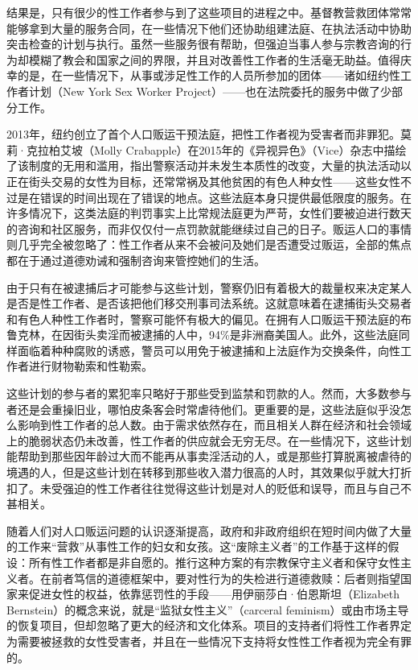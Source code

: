 \documentclass[fontset=fandol, a4paper, 12pt, openright]{ctexbook}
\begin{document}
结果是，只有很少的性工作者参与到了这些项目的进程之中。基督教营救团体常常能够拿到大量的服务合同，在一些情况下他们还协助组建法庭、在执法活动中协助突击检查的计划与执行。虽然一些服务很有帮助，但强迫当事人参与宗教咨询的行为却模糊了教会和国家之间的界限，并且对改善性工作者的生活毫无助益。值得庆幸的是，在一些情况下，从事或涉足性工作的人员所参加的团体——诸如纽约性工作者计划（New York Sex Worker Project）——也在法院委托的服务中做了少部分工作。

2013年，纽约创立了首个人口贩运干预法庭，把性工作者视为受害者而非罪犯。莫莉·克拉柏艾坡（Molly Crabapple）在2015年的《异视异色》（Vice）杂志中描绘了该制度的无用和滥用，指出警察活动并未发生本质性的改变，大量的执法活动以正在街头交易的女性为目标，还常常祸及其他贫困的有色人种女性——这些女性不过是在错误的时间出现在了错误的地点。这些法庭本身只提供最低限度的服务。在许多情况下，这类法庭的判罚事实上比常规法庭更为严苛，女性们要被迫进行数天的咨询和社区服务，而非仅仅付一点罚款就能继续过自己的日子。贩运人口的事情则几乎完全被忽略了：性工作者从来不会被问及她们是否遭受过贩运，全部的焦点都在于通过道德劝诫和强制咨询来管控她们的生活。

由于只有在被逮捕后才可能参与这些计划，警察仍旧有着极大的裁量权来决定某人是否是性工作者、是否该把他们移交刑事司法系统。这就意味着在逮捕街头交易者和有色人种性工作者时，警察可能怀有极大的偏见。在拥有人口贩运干预法庭的布鲁克林，在因街头卖淫而被逮捕的人中，94\%是非洲裔美国人。此外，这些法庭同样面临着种种腐败的诱惑，警员可以用免于被逮捕和上法庭作为交换条件，向性工作者进行财物勒索和性勒索。

这些计划的参与者的累犯率只略好于那些受到监禁和罚款的人。然而，大多数参与者还是会重操旧业，哪怕皮条客会时常虐待他们。更重要的是，这些法庭似乎没怎么影响到性工作者的总人数。由于需求依然存在，而且相关人群在经济和社会领域上的脆弱状态仍未改善，性工作者的供应就会无穷无尽。在一些情况下，这些计划能帮助到那些因年龄过大而不能再从事卖淫活动的人，或是那些打算脱离被虐待的境遇的人，但是这些计划在转移到那些收入潜力很高的人时，其效果似乎就大打折扣了。未受强迫的性工作者往往觉得这些计划是对人的贬低和误导，而且与自己不甚相关。

随着人们对人口贩运问题的认识逐渐提高，政府和非政府组织在短时间内做了大量的工作来“营救”从事性工作的妇女和女孩。这“废除主义者”的工作基于这样的假设：所有性工作者都是非自愿的。推行这种方案的有宗教保守主义者和保守女性主义者。在前者笃信的道德框架中，要对性行为的失检进行道德救赎：后者则指望国家来促进女性的权益，依靠惩罚性的手段——用伊丽莎白·伯恩斯坦（Elizabeth Bernstein）的概念来说，就是“监狱女性主义”（carceral feminism）或由市场主导的恢复项目，但却忽略了更大的经济和文化体系。项目的支持者们将性工作者界定为需要被拯救的女性受害者，并且在一些情况下支持将女性性工作者视为完全有罪的。
\end{document}
